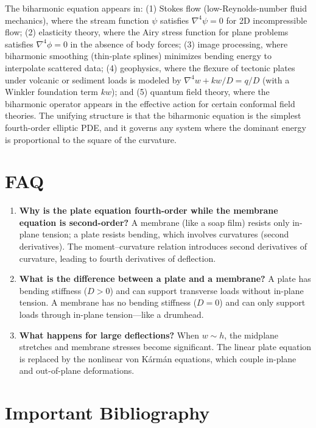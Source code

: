 \documentclass[11pt,openright]{book}
\begin{document}
The biharmonic equation appears in: (1) Stokes flow (low-Reynolds-number fluid mechanics), where the stream function $\psi$ satisfies $\nabla^{4}\psi = 0$ for 2D incompressible flow; (2) elasticity theory, where the Airy stress function for plane problems satisfies $\nabla^{4}\phi = 0$ in the absence of body forces; (3) image processing, where biharmonic smoothing (thin-plate splines) minimizes bending energy to interpolate scattered data; (4) geophysics, where the flexure of tectonic plates under volcanic or sediment loads is modeled by $\nabla^{4}w + kw/D = q/D$ (with a Winkler foundation term $kw$); and (5) quantum field theory, where the biharmonic operator appears in the effective action for certain conformal field theories. The unifying structure is that the biharmonic equation is the simplest fourth-order elliptic PDE, and it governs any system where the dominant energy is proportional to the square of the curvature.

\section*{FAQ}

\begin{enumerate}
\item \textbf{Why is the plate equation fourth-order while the membrane equation is second-order?}
A membrane (like a soap film) resists only in-plane tension; a plate resists bending, which involves curvatures (second derivatives). The moment--curvature relation introduces second derivatives of curvature, leading to fourth derivatives of deflection.

\item \textbf{What is the difference between a plate and a membrane?}
A plate has bending stiffness ($D > 0$) and can support transverse loads without in-plane tension. A membrane has no bending stiffness ($D = 0$) and can only support loads through in-plane tension---like a drumhead.

\item \textbf{What happens for large deflections?}
When $w \sim h$, the midplane stretches and membrane stresses become significant. The linear plate equation is replaced by the nonlinear von Kármán equations, which couple in-plane and out-of-plane deformations.
\end{enumerate}
\section*{Important Bibliography}
\end{document}
